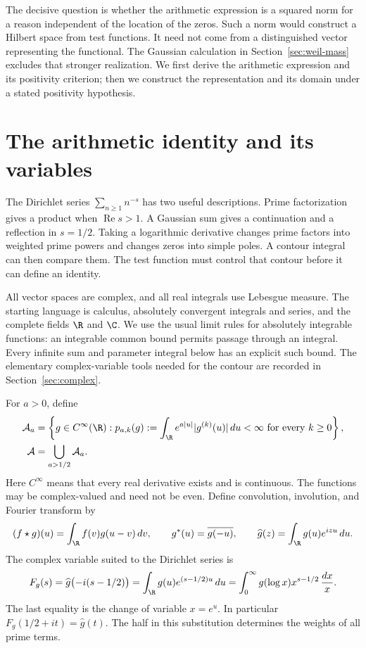The decisive question is whether the arithmetic expression is a squared
norm for a reason independent of the location of the zeros.
Such a norm would construct a Hilbert space from test functions.
It need not come from a distinguished vector representing the functional.
The Gaussian calculation in Section~\ref{sec:weil-mass} excludes that
stronger realization.  We first derive the arithmetic expression and its
positivity criterion; then we construct the representation and its domain
under a stated positivity hypothesis.

\section{The arithmetic identity and its variables}

The Dirichlet series $\sum_{n\geq1}n^{-s}$ has two useful descriptions.
Prime factorization gives a product when $\operatorname{Re}s>1$.
A Gaussian sum gives a continuation and a reflection in $s=1/2$.
Taking a logarithmic derivative changes prime factors into weighted prime
powers and changes zeros into simple poles.  A contour integral can then
compare them.  The test function must control that contour before it can
define an identity.

All vector spaces are complex, and all real integrals use Lebesgue measure.
The starting language is calculus, absolutely convergent integrals and
series, and the complete fields $\R$ and $\C$.
We use the usual limit rules for absolutely integrable functions: an
integrable common bound permits passage through an integral.
Every infinite sum and parameter integral below has an explicit such bound.
The elementary complex-variable tools needed for the contour are recorded
in Section~\ref{sec:complex}.

For $a>0$, define
\begin{equation}
 \begin{aligned}
 \A_a&=\left\{g\in C^\infty(\R):
   p_{a,k}(g):=\int_{\R}e^{a|u|}|g^{(k)}(u)|\,du<\infty
                     \text{ for every }k\geq0\right\},\\
 \A&=\bigcup_{a>1/2}\A_a.
 \end{aligned}
 \label{eq:test-class}
\end{equation}
Here $C^\infty$ means that every real derivative exists and is continuous.
The functions may be complex-valued and need not be even.
Define convolution, involution, and Fourier transform by
\begin{equation}
 (f\star g)(u)=\int_{\R}f(v)g(u-v)\,dv,
 \qquad g^*(u)=\overline{g(-u)},
 \qquad \widehat g(z)=\int_{\R}g(u)e^{izu}\,du.
 \label{eq:operations}
\end{equation}
The complex variable suited to the Dirichlet series is
\begin{equation}
 F_g(s)=\widehat g\bigl(-i(s-1/2)\bigr)
       =\int_{\R}g(u)e^{(s-1/2)u}\,du
       =\int_0^\infty g(\log x)x^{s-1/2}\,\frac{dx}{x}.
 \label{eq:centered-mellin}
\end{equation}
The last equality is the change of variable $x=e^u$.
In particular $F_g(1/2+it)=\widehat g(t)$.
The half in this substitution determines the weights of all prime terms.


